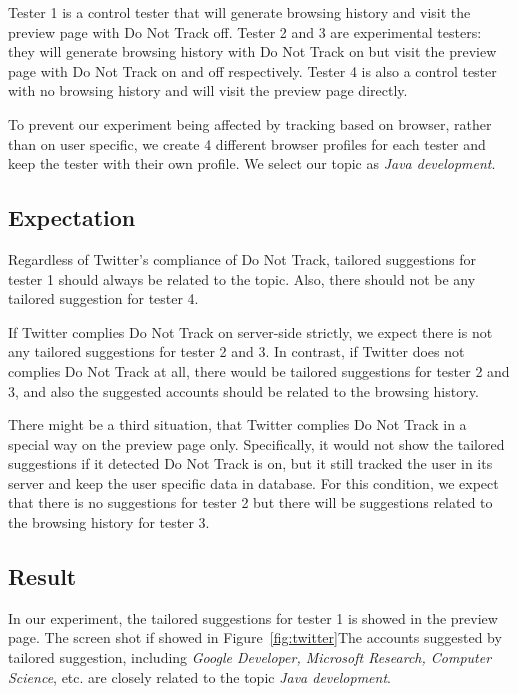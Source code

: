 \documentclass{sig-alternate}
\begin{document}
Tester 1 is a control tester that will generate browsing history and visit the preview page with Do Not Track off. Tester 2 and 3 are experimental testers: they will generate browsing history with Do Not Track on but visit the preview page with Do Not Track on and off respectively. Tester 4 is also a control tester with no browsing history and will visit the preview page directly.

To prevent our experiment being affected by tracking based on browser, rather than on user specific, we create 4 different browser profiles for each tester and keep the tester with their own profile. We select our topic as \emph{Java development}.

\subsection{Expectation} \label{sec:expect}

Regardless of Twitter's compliance of Do Not Track, tailored suggestions for tester 1 should always be related to the topic. Also, there should not be any tailored suggestion for tester 4.

If Twitter complies Do Not Track on server-side strictly, we expect there is not any tailored suggestions for tester 2 and 3. In contrast, if Twitter does not complies Do Not Track at all, there would be tailored suggestions for tester 2 and 3, and also the suggested accounts should be related to the browsing history.

There might be a third situation, that Twitter complies Do Not Track in a special way on the preview page only. Specifically, it would not show the tailored suggestions if it detected Do Not Track is on, but it still tracked the user in its server and keep the user specific data in database. For this condition, we expect that there is no suggestions for tester 2 but there will be suggestions related to the browsing history for tester 3.

\subsection{Result} \label{sec:result}

In our experiment, the tailored suggestions for tester 1 is showed in the preview page. The screen shot if showed in Figure~\ref{fig:twitter}The accounts suggested by tailored suggestion, including \emph{Google Developer, Microsoft Research, Computer Science}, etc. are closely related to the topic \emph{Java development}. 
\end{document}
